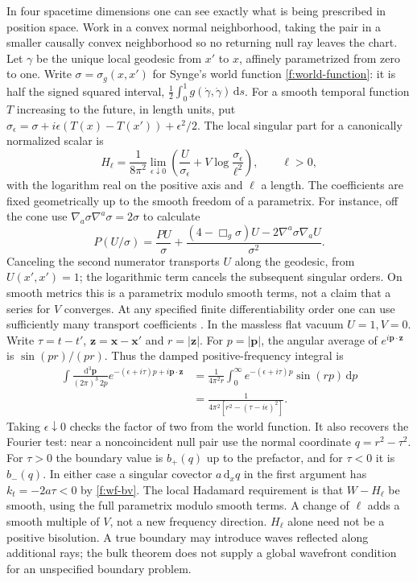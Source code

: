 In four spacetime dimensions one can see exactly what is being prescribed
in position space. Work in a convex normal neighborhood, taking the pair
in a smaller causally convex neighborhood so no returning null ray leaves
the chart. Let $\gamma$ be the unique local geodesic from $x'$ to $x$,
affinely parametrized from zero to one. Write $\sigma=\sigma_g(x,x')$ for
Synge's world function \eqref{f:world-function}: it is half the signed
squared interval, $\tfrac12\int_0^1 g(\dot\gamma,\dot\gamma)\,\mathrm{d}s$.
For a smooth temporal function $T$ increasing to the future, in length units,
put $\sigma_\epsilon=\sigma+i\epsilon(T(x)-T(x'))+\epsilon^2/2$.
The local singular part for a canonically normalized scalar is
\begin{equation}
 H_\ell=\frac1{8\pi^2}\lim_{\epsilon\downarrow0}
 \left(\frac{U}{\sigma_\epsilon}
       +V\log\frac{\sigma_\epsilon}{\ell^2}\right),\qquad \ell>0 ,
 \label{f:wf-parametrix}
\end{equation}
with the logarithm real on the positive axis and $\ell$ a length. The
coefficients are fixed geometrically up to the smooth freedom of a
parametrix. For instance, off the cone use
$\nabla_a\sigma\nabla^a\sigma=2\sigma$ to calculate
\[
 P(U/\sigma)=\frac{PU}{\sigma}
  +\frac{(4-\Box_g\sigma)U-2\nabla^a\sigma\nabla_a U}{\sigma^2} .
\]
Canceling the second numerator transports $U$ along the geodesic, from
$U(x',x')=1$; the logarithmic term cancels the subsequent singular orders.
On smooth metrics this is a parametrix modulo smooth terms, not a claim
that a series for $V$ converges. At any specified finite differentiability
order one can use sufficiently many transport coefficients
\cite{WaldQFT,HWick}. In the massless flat vacuum $U=1,V=0$. Write
$\tau=t-t'$, $\mathbf z=\mathbf x-\mathbf x'$ and $r=|\mathbf z|$.
For $p=|\mathbf p|$, the angular average of $e^{i\mathbf p\cdot\mathbf z}$
is $\sin(pr)/(pr)$. Thus the damped positive-frequency integral is
\begin{align*}
 \int \frac{\mathrm{d}^3\mathbf p}{(2\pi)^3\,2p}
       e^{-(\epsilon+i\tau)p+i\mathbf p\cdot\mathbf z}
 &=\frac1{4\pi^2 r}\int_0^\infty
         e^{-(\epsilon+i\tau)p}\sin(rp)\,\mathrm{d}p\\
 &=\frac1{4\pi^2[r^2-(\tau-i\epsilon)^2]} .
\end{align*}
Taking $\epsilon\downarrow0$ checks the factor of two from the world
function. It also recovers the Fourier test: near a noncoincident null
pair use the normal coordinate $q=r^2-\tau^2$. For $\tau>0$ the boundary
value is $b_+(q)$ up to the prefactor, and for $\tau<0$ it is $b_-(q)$.
In either case a singular covector $a\,\mathrm{d}_x q$ in the first
argument has $k_t=-2a\tau<0$ by \eqref{f:wf-bv}.
The local Hadamard requirement is that $W-H_\ell$ be smooth, using the
full parametrix modulo smooth terms. A change of $\ell$ adds a smooth
multiple of $V$, not a new frequency direction. $H_\ell$ alone
need not be a positive bisolution. A true boundary may introduce waves
reflected along additional rays; the bulk theorem does not supply a
global wavefront condition for an unspecified boundary problem.

